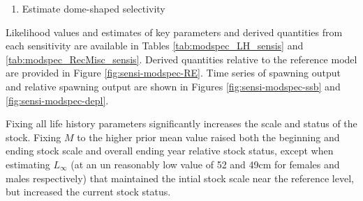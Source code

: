 \documentclass[11pt,
  english,
  a4paper,
]{article}
\begin{document}
\begin{itemize}
\begin{enumerate}
    \tagmcend\tagstructend\tagstructend

    \tagmcend\tagstructend\tagstructend
  \item


    Estimate dome-shaped selectivity

    \tagmcend\tagstructend\tagstructend

    \tagmcend\tagstructend\tagstructend
  \end{enumerate}

  \tagstructend
\end{itemize}

\tagstructend


Likelihood values and estimates of key parameters and derived quantities from each sensitivity are available in Tables \ref{tab:modspec_LH_sensis} and \ref{tab:modspec_RecMisc_sensis}. Derived quantities relative to the reference model are provided in Figure \ref{fig:sensi-modspec-RE}. Time series of spawning output and relative spawning output are shown in Figures \ref{fig:sensi-modspec-ssb} and \ref{fig:sensi-modspec-depl}.

\leavevmode\tagmcend\tagstructend\par


Fixing all life history parameters significantly increases the scale and status of the stock. Fixing {\(M\)\leavevmode\tagmcend\tagstructend} to the higher prior mean value raised both the beginning and ending stock scale and overall ending year relative stock status, except when estimating {\(L_{\infty}\)\leavevmode\tagmcend\tagstructend} (at an un reasonably low value of 52 and 49cm for females and males respectively) that maintained the intial stock scale near the reference level, but increased the current stock status.

\leavevmode\tagmcend\tagstructend\par

\end{document}
